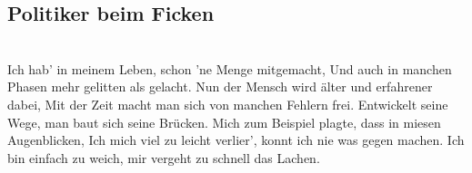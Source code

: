 \subsection{Politiker beim Ficken}

\begin{guitar}
\\
Ich hab' in meinem Leben, schon 'ne Menge mitgemacht,
Und auch in manchen Phasen mehr gelitten als gelacht.
Nun der Mensch wird älter und erfahrener dabei,
Mit der Zeit macht man sich von manchen Fehlern frei.
Entwickelt seine Wege, man baut sich seine Brücken.
Mich zum Beispiel plagte, dass in miesen Augenblicken,
Ich mich viel zu leicht verlier', konnt ich nie was gegen machen.
Ich bin einfach zu weich, mir vergeht zu schnell das Lachen.













\end{guitar}